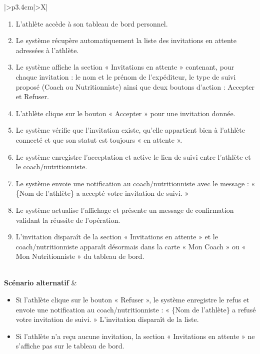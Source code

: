 \documentclass[a4paper,12pt]{report}
\begin{document}
\begin{table}[H]
\begin{tabularx}{\textwidth}{|>{\RaggedRight\arraybackslash}p{3.4cm}|>{\RaggedRight\arraybackslash}X|}
\begin{minipage}[t]{\linewidth}
\begin{enumerate}[label=\arabic*., leftmargin=*, topsep=0pt, itemsep=1pt]
    \item L'athlète accède à son tableau de bord personnel.
    \item Le système récupère automatiquement la liste des invitations en attente adressées à l'athlète.
    \item Le système affiche la section « Invitations en attente » contenant, pour chaque invitation : le nom et le prénom de l'expéditeur, le type de suivi proposé (Coach ou Nutritionniste) ainsi que deux boutons d'action : Accepter et Refuser.
    \item L'athlète clique sur le bouton « Accepter » pour une invitation donnée.
    \item Le système vérifie que l'invitation existe, qu'elle appartient bien à l'athlète connecté et que son statut est toujours « en attente ».
    \item Le système enregistre l'acceptation et active le lien de suivi entre l'athlète et le coach/nutritionniste.
    \item Le système envoie une notification au coach/nutritionniste avec le message : « \{Nom de l'athlète\} a accepté votre invitation de suivi. »
    \item Le système actualise l'affichage et présente un message de confirmation validant la réussite de l'opération.
    \item L'invitation disparaît de la section « Invitations en attente » et le coach/nutritionniste apparaît désormais dans la carte « Mon Coach » ou « Mon Nutritionniste » du tableau de bord.
\end{enumerate}
\vspace{2pt}
\end{minipage} \\
\hline
\textbf{Scénario alternatif} &
\begin{minipage}[t]{\linewidth}\sloppy
\vspace{2pt}
\begin{itemize}[leftmargin=*, topsep=0pt, itemsep=1pt]
    \item  Si l'athlète clique sur le bouton « Refuser », le système enregistre le refus et envoie une notification au coach/nutritionniste : « \{Nom de l'athlète\} a refusé votre invitation de suivi. » L'invitation disparaît de la liste.
  
    \item  Si l'athlète n'a reçu aucune invitation, la section « Invitations en attente » ne s'affiche pas sur le tableau de bord.
\end{itemize}
\vspace{2pt}
\end{minipage} \\
\hline
\end{tabularx}
\fussy
\end{table}
\endgroup
\end{document}
